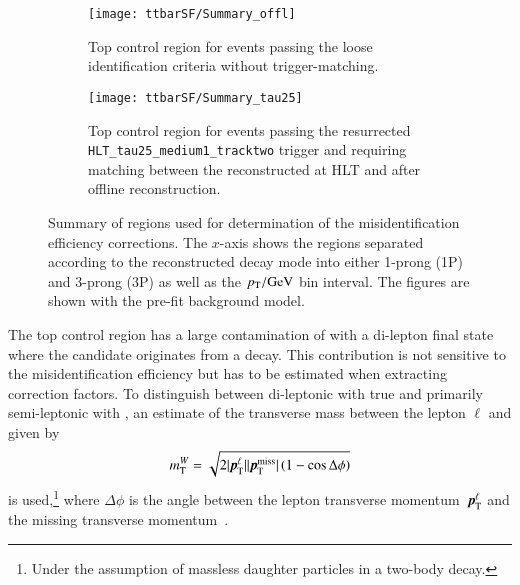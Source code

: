 \begin{figure}[htbp]
  \centering

  \begin{subfigure}[t]{.485\textwidth}
    \texttt{[image: ttbarSF/Summary\_offl]}
    \caption{Top control region for events passing the loose
      \tauhadvis identification criteria without trigger-matching.}
  \end{subfigure}\hfill%
  \begin{subfigure}[t]{.485\textwidth}
    \texttt{[image: ttbarSF/Summary\_tau25]}
    \caption{Top control region for events passing the resurrected
      \texttt{HLT\_tau25\_medium1\_tracktwo} trigger and requiring
      matching between the reconstructed \tauhadvis at HLT and after
      offline \tauhadvis reconstruction.}
  \end{subfigure}

  \caption{Summary of regions used for determination of the
    \jettotauhadvis misidentification efficiency corrections. The
    $x$-axis shows the regions separated according to the
    reconstructed decay mode into either 1-prong (1P) and 3-prong (3P)
    \tauhadvis as well as the \tauhadvis $\pT /\si{\GeV}$ bin
    interval. The figures are shown with the pre-fit background
    model.}
  \label{fig:ttbarsf_region_summary_prefit}
\end{figure}

The top control region has a large contamination of \ttbar with a
di-lepton final state where the \tauhadvis candidate originates from a
\tauhad decay. This contribution is not sensitive to the
\jettotauhadvis misidentification efficiency but has to be estimated
when extracting correction factors. To distinguish between di-leptonic
\ttbar with true \tauhadvis and primarily semi-leptonic \ttbar with
\faketauhadvis, an estimate of the transverse mass between the lepton
$\ell$ and \pTmissAbs given by
\begin{align*}
  \mTW = \sqrt{2 | \myvec{p}_{\text{T}}^{\ell} | | \pTmiss | \left( 1 - \cos \Delta\phi \right)}
\end{align*}
is used,\footnote{Under the assumption of massless daughter particles
  in a two-body decay.} where $\Delta \phi$ is the angle between the
lepton transverse momentum~$\myvec{p}_{\text{T}}^{\ell}$ and the
missing transverse momentum~\pTmiss.

